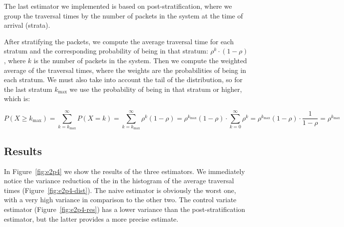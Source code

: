 \documentclass[a4paper]{article}
\begin{document}
The last estimator we implemented is based on post-stratification, where we group the traversal times by the number of packets in the system at the time of arrival (strata).

After stratifying the packets, we compute the average traversal time for each stratum and the corresponding probability of being in that stratum: $\rho^k \cdot (1 - \rho)$, where $k$ is the number of packets in the system.
Then we compute the weighted average of the traversal times, where the weights are the probabilities of being in each stratum. We must also take into account the tail of the distribution, so for the last stratum $k_{\text{max}}$ we use the probability of being in that stratum or higher, which is:

\begin{equation}
  P(X \geq k_{\text{max}}) =
  \sum_{k=k_{\text{max}}}^{\infty} P(X = k) =
  \sum_{k=k_{\text{max}}}^{\infty} \rho^k (1 - \rho) =
  \rho^{k_{\text{max}}} (1 - \rho) \cdot \sum_{k=0}^{\infty} \rho^k =
  \rho^{k_{\text{max}}} (1 - \rho) \cdot \frac{1}{1 - \rho} =
  \rho^{k_{\text{max}}}
\end{equation}


\subsection*{Results}

In Figure~\ref{fig:e2p4} we show the results of the three estimators. We immediately notice the variance reduction of the in the histogram of the average traversal times (Figure~\ref{fig:e2p4-dist}).
The naive estimator is obviously the worst one, with a very high variance in comparison to the other two.
The control variate estimator (Figure~\ref{fig:e2p4-res}) has a lower variance than the post-stratification estimator, but the latter provides a more precise estimate.
\end{document}
